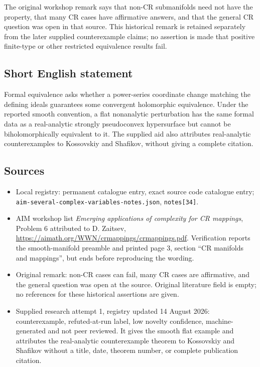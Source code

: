\documentclass[11pt]{article}
\begin{document}
The original workshop remark says that non-CR submanifolds need not have the property, that many CR cases have affirmative answers, and that the general CR question was open in that source. This historical remark is retained separately from the later supplied counterexample claims; no assertion is made that positive finite-type or other restricted equivalence results fail.
\subsection{Short English statement}
Formal equivalence asks whether a power-series coordinate change matching the defining ideals guarantees some convergent holomorphic equivalence. Under the reported smooth convention, a flat nonanalytic perturbation has the same formal data as a real-analytic strongly pseudoconvex hypersurface but cannot be biholomorphically equivalent to it. The supplied aid also attributes real-analytic counterexamples to Kossovskiy and Shafikov, without giving a complete citation.
\subsection{Sources}
\begin{itemize}
\item Local registry: permanent catalogue entry, exact source code catalogue entry; \texttt{aim-several-complex-variables-notes.json}, \texttt{notes[34]}.
\item AIM workshop list \emph{Emerging applications of complexity for CR mappings}, Problem 6 attributed to D. Zaitsev, \url{https://aimath.org/WWN/crmappings/crmappings.pdf}. Verification reports the smooth-manifold preamble and printed page 3, section ``CR manifolds and mappings'', but ends before reproducing the wording.
\item Original remark: non-CR cases can fail, many CR cases are affirmative, and the general question was open at the source. Original literature field is empty; no references for these historical assertions are given.
\item Supplied research attempt 1, registry updated 14 August 2026: counterexample, refuted-at-run label, low novelty confidence, machine-generated and not peer reviewed. It gives the smooth flat example and attributes the real-analytic counterexample theorem to Kossovskiy and Shafikov without a title, date, theorem number, or complete publication citation.
\end{itemize}
\end{document}
